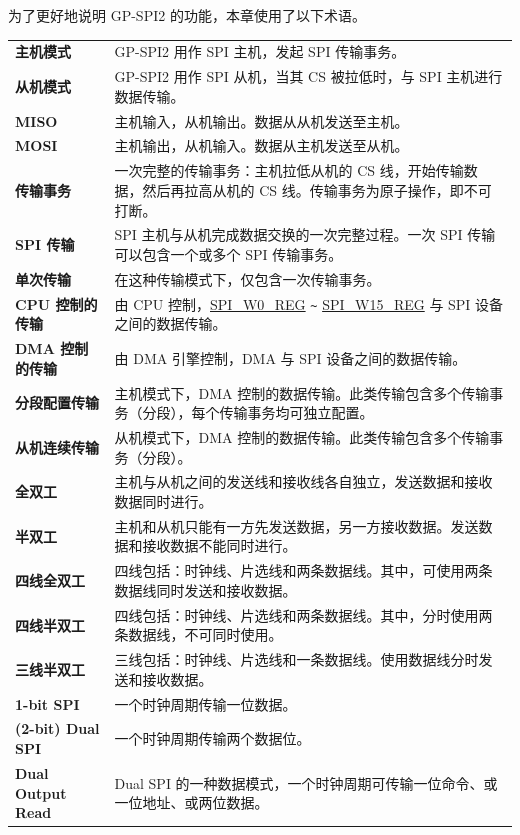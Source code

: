 为了更好地说明 GP-SPI2 的功能，本章使用了以下术语。

\begin{longtable}[c]{ R{4cm} p{10cm} }

\textbf{主机模式}     & GP-SPI2 用作 SPI 主机，发起 SPI 传输事务。\\
\textbf{从机模式}      & GP-SPI2 用作 SPI 从机，当其 CS 被拉低时，与 SPI 主机进行数据传输。\\
\textbf{MISO}       & 主机输入，从机输出。数据从从机发送至主机。\\
\textbf{MOSI}  & 主机输出，从机输入。数据从主机发送至从机。\\
\textbf{传输事务} & 一次完整的传输事务：主机拉低从机的 CS 线，开始传输数据，然后再拉高从机的 CS 线。传输事务为原子操作，即不可打断。\\
\textbf{SPI 传输} & SPI 主机与从机完成数据交换的一次完整过程。一次 SPI 传输可以包含一个或多个 SPI 传输事务。\\
\textbf{单次传输} & 在这种传输模式下，仅包含一次传输事务。\\
\textbf{CPU 控制的传输}& 由 CPU 控制，\hyperref[regdesc:SPIW0REG]{SPI\_W0\_REG} \verb+~+ \hyperref[regdesc:SPIW0REG]{SPI\_W15\_REG} 与 SPI 设备之间的数据传输。\\
\textbf{DMA 控制的传输}& 由 DMA 引擎控制，DMA 与 SPI 设备之间的数据传输。\\
\textbf{分段配置传输}& 主机模式下，DMA 控制的数据传输。此类传输包含多个传输事务（分段），每个传输事务均可独立配置。\\
\textbf{从机连续传输} & 从机模式下，DMA 控制的数据传输。此类传输包含多个传输事务（分段）。\\
\textbf{全双工} & 主机与从机之间的发送线和接收线各自独立，发送数据和接收数据同时进行。\\
\textbf{半双工} & 主机和从机只能有一方先发送数据，另一方接收数据。发送数据和接收数据不能同时进行。\\
\textbf{四线全双工} & 四线包括：时钟线、片选线和两条数据线。其中，可使用两条数据线同时发送和接收数据。\\
\textbf{四线半双工} & 四线包括：时钟线、片选线和两条数据线。其中，分时使用两条数据线，不可同时使用。\\
\textbf{三线半双工} & 三线包括：时钟线、片选线和一条数据线。使用数据线分时发送和接收数据。\\
\textbf{1-bit SPI} & 一个时钟周期传输一位数据。\\ 
\textbf{(2-bit) Dual SPI} & 一个时钟周期传输两个数据位。\\
\textbf{Dual Output Read} & Dual SPI 的一种数据模式，一个时钟周期可传输一位命令、或一位地址、或两位数据。\\

\end{longtable}
